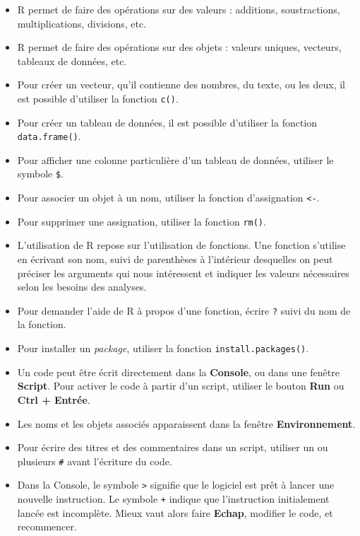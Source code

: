 \documentclass[
  letterpaper,
]{book}
\providecommand{\tightlist}{%
  \setlength{\itemsep}{0pt}\setlength{\parskip}{0pt}}\usepackage{longtable,booktabs,array}
\begin{document}
\begin{itemize}
\tightlist
\item
  R permet de faire des opérations sur des valeurs : additions,
  soustractions, multiplications, divisions, etc.
\item
  R permet de faire des opérations sur des objets : valeurs uniques,
  vecteurs, tableaux de données, etc.
\item
  Pour créer un vecteur, qu'il contienne des nombres, du texte, ou les
  deux, il est possible d'utiliser la fonction \texttt{c()}.
\item
  Pour créer un tableau de données, il est possible d'utiliser la
  fonction \texttt{data.frame()}.
\item
  Pour afficher une colonne particulière d'un tableau de données,
  utiliser le symbole \texttt{\$}.
\item
  Pour associer un objet à un nom, utiliser la fonction d'assignation
  \texttt{\textless{}-}.
\item
  Pour supprimer une assignation, utiliser la fonction \texttt{rm()}.
\item
  L'utilisation de R repose sur l'utilisation de fonctions. Une fonction
  s'utilise en écrivant son nom, suivi de parenthèses à l'intérieur
  desquelles on peut préciser les arguments qui nous intéressent et
  indiquer les valeurs nécessaires selon les besoins des analyses.
\item
  Pour demander l'aide de R à propos d'une fonction, écrire \texttt{?}
  suivi du nom de la fonction.
\item
  Pour installer un \emph{package}, utiliser la fonction
  \texttt{install.packages()}.
\item
  Un code peut être écrit directement dans la \textbf{Console}, ou dans
  une fenêtre \textbf{Script}. Pour activer le code à partir d'un
  script, utiliser le bouton \textbf{Run} ou \textbf{Ctrl + Entrée}.
\item
  Les noms et les objets associés apparaissent dans la fenêtre
  \textbf{Environnement}.
\item
  Pour écrire des titres et des commentaires dans un script, utiliser un
  ou plusieurs \texttt{\#} avant l'écriture du code.
\item
  Dans la Console, le symbole \texttt{\textgreater{}} signifie que le
  logiciel est prêt à lancer une nouvelle instruction. Le symbole
  \texttt{+} indique que l'instruction initialement lancée est
  incomplète. Mieux vaut alors faire \textbf{Echap}, modifier le code,
  et recommencer.
\end{itemize}
\end{document}
